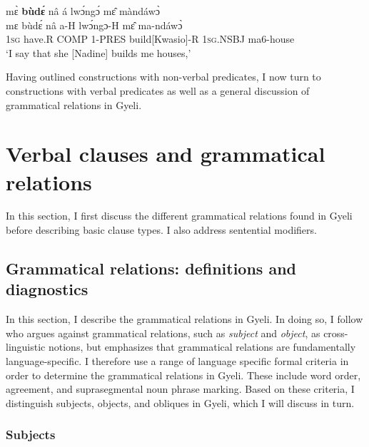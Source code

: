 \begin{exe} 
\ex\label{budeQI2} 
  \glll mɛ̀ {\bfseries bùdɛ́} nâ á lwɔ́ngɔ́ mɛ̂ màndáwɔ̀ \\
        mɛ bùdɛ́ nâ a-H lwɔ́ngɔ-H mɛ̂ ma-ndáwɔ̀ \\
       1\textsc{sg} have.R COMP 1-PRES build[Kwasio]-R 1\textsc{sg}.NSBJ ma6-house   \\
    \trans `I say that she [Nadine] builds me houses,'
\end{exe}

\noindent Having outlined constructions with non-verbal predicates, I now turn to constructions with verbal predicates as well as a general discussion of grammatical relations in Gyeli.











\section{Verbal clauses and grammatical relations}
\label{sec:verbalC}

In this section, I first discuss the different grammatical relations found in Gyeli before describing basic clause types. I also address sentential modifiers.




\subsection[Grammatical relations]{Grammatical relations: definitions and diagnostics}
\label{sec:GR}

In this section, I describe the grammatical relations in Gyeli. In doing so, I follow \citet{dryer97} who argues against grammatical relations, such as {\itshape subject} and {\itshape object}, as cross-linguistic notions, but emphasizes that grammatical relations are fundamentally language-specific.
I therefore use a range of language specific formal criteria in order to determine the grammatical relations in Gyeli. These include word order, agreement, and suprasegmental noun phrase marking. Based on these criteria, I distinguish subjects, objects, and obliques in Gyeli, which I will discuss in turn.





\subsubsection{Subjects}
\label{sec:SBJ}

